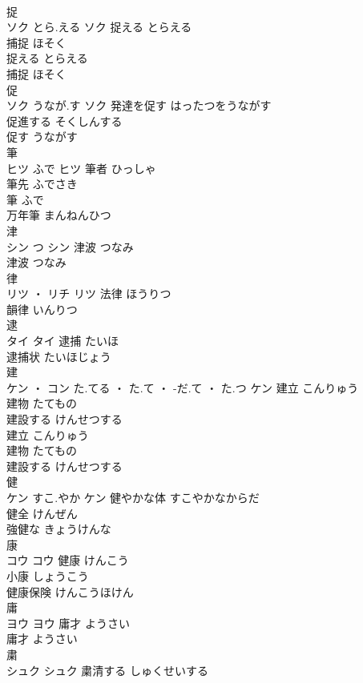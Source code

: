 \documentclass[8pt]{extreport}
\begin{document}
\begin{CJK}{UTF8}{min}
\\	捉	
\\	ソク	とら.える	ソク	捉える	とらえる	
\\	捕捉	ほそく	
\\	捉える	とらえる	
\\	捕捉	ほそく	
\\	促	
\\	ソク	うなが.す	ソク	発達を促す	はったつをうながす	
\\	促進する	そくしんする	
\\	促す	うながす	
\\	筆	
\\	ヒツ	ふで	ヒツ	筆者	ひっしゃ	
\\	筆先	ふでさき	
\\	筆	ふで	
\\	万年筆	まんねんひつ	
\\	津	
\\	シン	つ	シン	津波	つなみ	
\\	津波	つなみ	
\\	律	
\\	リツ ・ リチ		リツ	法律	ほうりつ	
\\	韻律	いんりつ	
\\	逮	
\\	タイ		タイ	逮捕	たいほ	
\\	逮捕状	たいほじょう	
\\	建	
\\	ケン ・ コン	た.てる ・ た.て ・ -だ.て ・ た.つ	ケン	建立	こんりゅう	
\\	建物	たてもの	
\\	建設する	けんせつする	
\\	建立	こんりゅう	
\\	建物	たてもの	
\\	建設する	けんせつする	
\\	健	
\\	ケン	すこ.やか	ケン	健やかな体	すこやかなからだ	
\\	健全	けんぜん	
\\	強健な	きょうけんな	
\\	康	
\\	コウ		コウ	健康	けんこう	
\\	小康	しょうこう	
\\	健康保険	けんこうほけん	
\\	庸	
\\	ヨウ		ヨウ	庸才	ようさい	
\\	庸才	ようさい	
\\	粛	
\\	シュク		シュク	粛清する	しゅくせいする	

\end{CJK}
\end{document}
